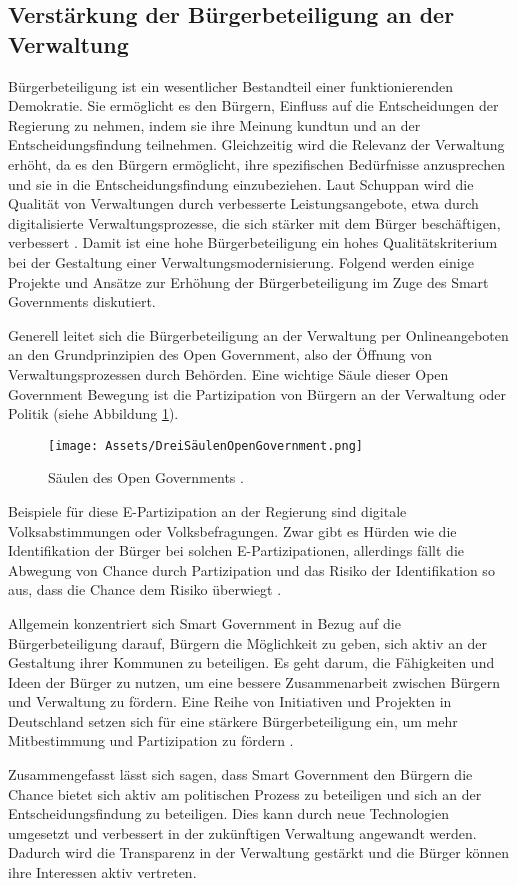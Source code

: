 \subsection{Verstärkung der Bürgerbeteiligung an der Verwaltung}
Bürgerbeteiligung ist ein wesentlicher Bestandteil einer funktionierenden Demokratie. 
Sie ermöglicht es den Bürgern, Einfluss auf die Entscheidungen der Regierung zu nehmen, indem sie ihre Meinung kundtun und an der Entscheidungsfindung teilnehmen.
Gleichzeitig wird die Relevanz der Verwaltung erhöht, da es den Bürgern ermöglicht, ihre spezifischen Bedürfnisse anzusprechen und sie in die Entscheidungsfindung einzubeziehen.
Laut Schuppan wird die Qualität von Verwaltungen durch verbesserte Leistungsangebote, etwa durch digitalisierte Verwaltungsprozesse, die sich stärker mit dem Bürger beschäftigen, verbessert \citep[Vgl.][S.35]{Schuppan2016}.
Damit ist eine hohe Bürgerbeteiligung ein hohes Qualitätskriterium bei der Gestaltung einer Verwaltungsmodernisierung.
Folgend werden einige Projekte und Ansätze zur Erhöhung der Bürgerbeteiligung im Zuge des Smart Governments diskutiert.
\par
Generell leitet sich die Bürgerbeteiligung an der Verwaltung per Onlineangeboten an den Grundprinzipien des Open Government, also der Öffnung von Verwaltungsprozessen durch Behörden.
Eine wichtige Säule dieser Open Government Bewegung ist die Partizipation von Bürgern an der Verwaltung oder Politik (siehe Abbildung \ref{fig:DreiSäulenOpenGovernment}).
\begin{figure}[h]
 \centering
 \texttt{[image: Assets/DreiSäulenOpenGovernment.png]}
 \caption{Säulen des Open Governments \citep[][]{Leitner2018}.}
 \label{fig:DreiSäulenOpenGovernment}
\end{figure}
Beispiele für diese E-Partizipation an der Regierung sind digitale Volksabstimmungen oder Volksbefragungen.
Zwar gibt es Hürden wie die Identifikation der Bürger bei solchen E-Partizipationen, allerdings fällt die Abwegung von Chance durch Partizipation und das Risiko der Identifikation so aus, dass die Chance dem Risiko überwiegt \citep[][S. 15]{Leitner2018}.
\par
Allgemein konzentriert sich Smart Government in Bezug auf die Bürgerbeteiligung darauf, Bürgern die Möglichkeit zu geben, sich aktiv an der Gestaltung ihrer Kommunen zu beteiligen. 
Es geht darum, die Fähigkeiten und Ideen der Bürger zu nutzen, um eine bessere Zusammenarbeit zwischen Bürgern und Verwaltung zu fördern.  
Eine Reihe von Initiativen und Projekten in Deutschland setzen sich für eine stärkere Bürgerbeteiligung ein, um mehr Mitbestimmung und Partizipation zu fördern \citep[][S. 18, 49-50]{Leitner2018}.
\par 
Zusammengefasst lässt sich sagen, dass Smart Government den Bürgern die Chance bietet sich aktiv am politischen Prozess zu beteiligen und sich an der Entscheidungsfindung zu beteiligen. 
Dies kann durch neue Technologien umgesetzt und verbessert in der zukünftigen Verwaltung angewandt werden.
Dadurch wird die Transparenz in der Verwaltung gestärkt und die Bürger können ihre Interessen aktiv vertreten.
